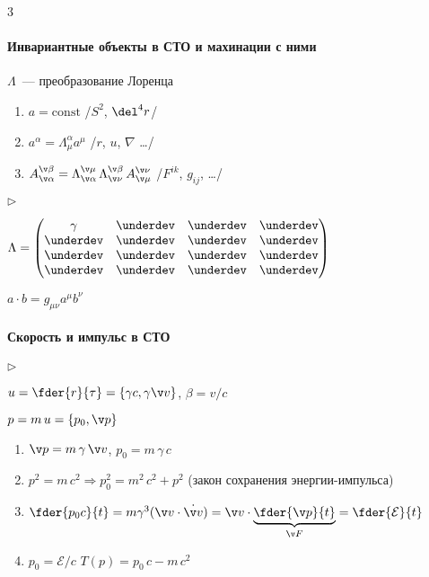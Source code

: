 \documentclass[draft]{trchesh}
\newenvironment{facts}{\begin{list}{$\triangleright$}{}}{\end{list}}
\begin{document}
\begin{multicols*}{3}
\paragraph{Инвариантные объекты в СТО и махинации с ними\underdev}
$\Lambda$~--- преобразование Лоренца
\begin{enumerate}
  \item $a = \mathrm{const}$ \hfill /$S^2$, $\del^4r$/
  \item $a^\alpha = \Lambda^\alpha_\mu a^\mu$ \hfill /$r$, $u$, $\nabla$ \dots/
  \item $A_{\v \alpha}^{\v \beta} = \Lambda_{\v \alpha}^{\v \mu} \, \Lambda_{\v \nu}^{\v \beta}\,
    A_{\v \mu}^{\v \nu}$ \hfill /$F^{ik}$, $g_{ij}$, \dots/
\end{enumerate}

\begin{facts}
\item $\Lambda = \begin{pmatrix}
  \gamma &  \underdev & \underdev&\underdev \\
  \underdev &  \underdev & \underdev&\underdev \\
  \underdev &  \underdev & \underdev&\underdev \\
  \underdev &  \underdev & \underdev&\underdev
\end{pmatrix}$
\item $a \cdot b = g_{\mu\nu} a^\mu b^\nu$
\end{facts}

\paragraph{Скорость и импульс в СТО}

\begin{facts}
  \item $u = \fder{r}{\tau}  = \{\gamma c, \gamma \v v\}$, $\beta = v / c$
  \item $p = m \, u = \{p_0, \v p\}$
\end{facts}
\begin{enumerate}
\item $\v p = m \, \gamma \, \v v$, $p_0 = m \, \gamma \, c$
\item $p^2 = m\, c^2 \Rightarrow p_0^2 = m^2\,c^2 + p^2$ (закон сохранения энергии-импульса)
\item $\fder{p_0 c}{t} = m \gamma^3 (\v v \cdot \dot{\v v}) = 
  \v v \cdot \underbrace{\fder{\v p}{t}}_{\v F} = \fder{\mathcal E}{t}$
\item $p_0 = \mathcal E/c$  $T(p) = p_0\, c - m\,c^2$
\end{enumerate}


\end{multicols*}
\end{document}
